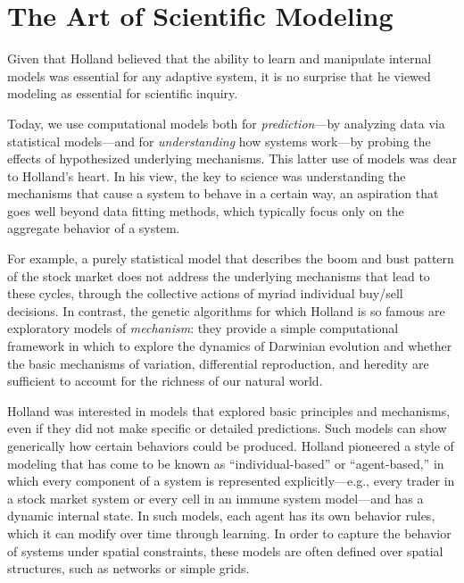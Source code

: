 \documentclass{sig-alternate}
\begin{document}

\section{The Art of Scientific Modeling}

Given that Holland believed that the ability to learn and manipulate
internal models was essential for any adaptive system, it is no
surprise that he viewed modeling as essential for scientific inquiry.


Today, we use computational models both for \emph{prediction}---by
analyzing data via statistical models---and for \emph{understanding}
how systems work---by probing the effects of hypothesized underlying
mechanisms.  This latter use of models was dear to Holland's heart.
In his view, the key to science was understanding the mechanisms that
cause a system to behave in a certain way, an aspiration that goes
well beyond data fitting methods, which typically focus only on
the aggregate behavior of a system.  

For example, a purely statistical model that describes the boom and bust
pattern of the stock market
does not address the underlying mechanisms
that lead to these cycles, through the collective actions of myriad
individual buy/sell decisions.  
In contrast, the genetic algorithms for which Holland is so famous
are exploratory models of \emph{mechanism}: they provide a simple
computational framework in which to explore the dynamics of Darwinian
evolution and whether the basic mechanisms of variation, differential
reproduction, and heredity are sufficient to account for the richness
of our natural world.

Holland was interested in models that explored basic principles and
mechanisms, even if they did not make specific or detailed
predictions.  Such models can show generically how certain behaviors
could be produced.  Holland pioneered a style of modeling that has
come to be known as ``individual-based'' or ``agent-based,'' in which
every component of a system is represented explicitly---e.g., every
trader in a stock market system or every cell in an immune system
model---and has a dynamic internal state. In such models, each agent has
its own behavior rules, which it can modify over time through learning.  In
order to capture the behavior of systems under spatial
constraints, these models are often defined over spatial structures,
such as networks or simple grids.
\end{document}
